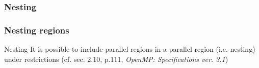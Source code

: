 %




%



\subsubsection{Nesting}

\begin{frame}
\frametitle{Nesting regions}

\begin{exampleblock}{Nesting}
It is possible to include parallel regions in a parallel region (i.e. nesting) under restrictions (cf. sec. 2.10, p.111, \textit{OpenMP: Specifications ver. 3.1})
\end{exampleblock}


\end{frame}



